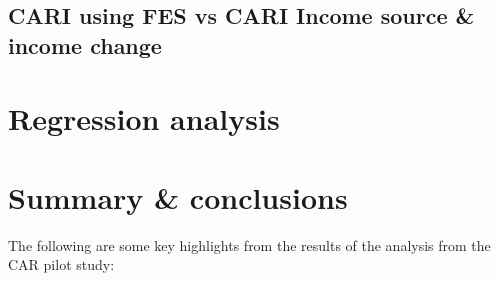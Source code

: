 \documentclass[11pt,harvard]{article}
\begin{document}
	\subsection{CARI using FES vs CARI Income source \& income change}

	
	\pagebreak
	
	
	\section{Regression analysis}
	
	
	
	\pagebreak
	
	
	\section{Summary \& conclusions}
	
	The following are some key highlights from the results of the analysis from the CAR pilot study:
	
\end{document}
